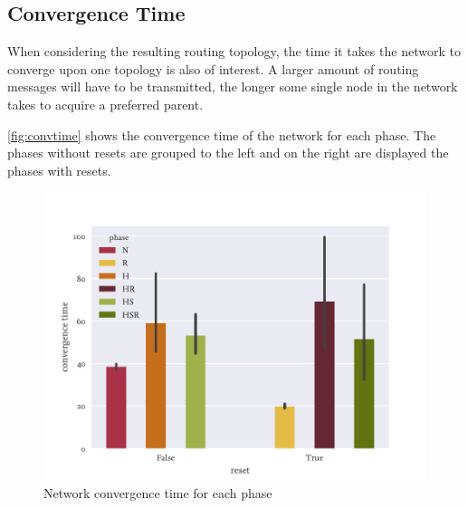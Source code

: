 %
%
%
%

\subsection{Convergence Time}

When considering the resulting routing topology, the time it takes the network
to converge upon one topology is also of interest. A larger amount of
routing messages will have to be transmitted, the longer some single node in the
network takes to acquire a preferred parent.

\autoref{fig:convtime} shows the convergence time of the network for each phase.
The phases without resets are grouped to the left and on the right are displayed
the phases with resets.

\begin{figure}
  \centering
  \includegraphics[height=0.3\textheight]{../images/convergence.pdf}
  \caption{Network convergence time for each phase}
  \label{fig:convtime}
\end{figure}

